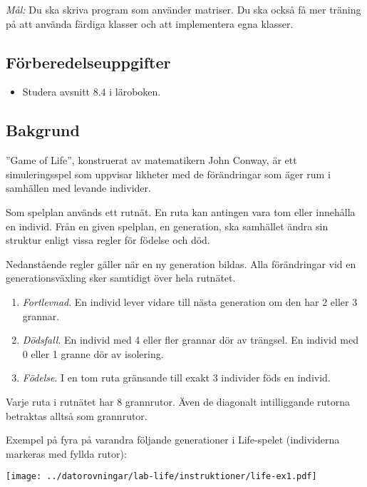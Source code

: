 \newpage
{}

\emph{Mål:} Du ska skriva program som använder matriser. Du ska också få mer träning
på att använda färdiga klasser och att implementera egna klasser.

\subsection*{Förberedelseuppgifter}
\begin{itemize} \tightlist
\item Studera avsnitt 8.4 i läroboken.
\end{itemize}

\subsection*{Bakgrund}
''Game of Life'', konstruerat av matematikern John Conway, är ett simuleringsspel som uppvisar likheter med de förändringar som äger rum i samhällen med levande individer.

Som spelplan används ett rutnät. En ruta kan antingen vara tom eller innehålla en individ. Från en given spelplan, en generation, ska samhället ändra sin struktur enligt vissa regler för födelse och död.

Nedanstående regler gäller när en ny generation bildas. Alla förändringar vid en generationsväxling
sker samtidigt över hela rutnätet.
\begin{enumerate} \tightlist
\item \textit{Fortlevnad}. En individ lever vidare till nästa generation om den har 2 eller 3 grannar.
\item \textit{Dödsfall}. En individ med 4 eller fler grannar dör av trängsel. En individ med 0 eller 1 granne dör av isolering.
\item \textit{Födelse}. I en tom ruta gränsande till exakt 3 individer föds en individ.
\end{enumerate}

Varje ruta i rutnätet har 8 grannrutor. Även de diagonalt intilliggande rutorna betraktas alltså som grannrutor.

Exempel på fyra på varandra följande generationer i Life-spelet (individerna markeras
med fyllda rutor):

\begin{center}
\texttt{[image: ../datorovningar/lab-life/instruktioner/life-ex1.pdf]}
\end{center}

